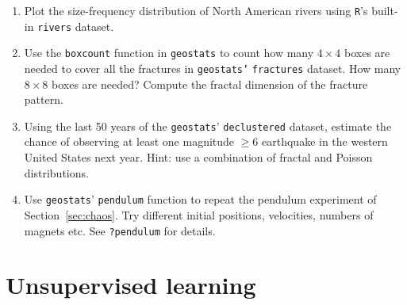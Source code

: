 \begin{enumerate}
  
\item Plot the size-frequency distribution of North American rivers
  using \texttt{R}'s built-in \texttt{rivers} dataset.

\item Use the \texttt{boxcount} function in \texttt{geostats} to count
  how many $4\times{4}$ boxes are needed to cover all the fractures in
  \texttt{geostats'} \texttt{fractures} dataset. How many $8\times{8}$
  boxes are needed? Compute the fractal dimension of the fracture
  pattern.
  
\item Using the last 50 years of the \texttt{geostats}'
  \texttt{declustered} dataset, estimate the chance of observing at
  least one magnitude $\geq$6 earthquake in the western United States
  next year. Hint: use a combination of fractal and Poisson
  distributions.

\item Use \texttt{geostats}' \texttt{pendulum} function to repeat the
  pendulum experiment of Section~\ref{sec:chaos}. Try different
  initial positions, velocities, numbers of magnets etc. See
  \texttt{?pendulum} for details.
  
\end{enumerate}

\section{Unsupervised learning}
\label{sec:ex-unsupervised}

